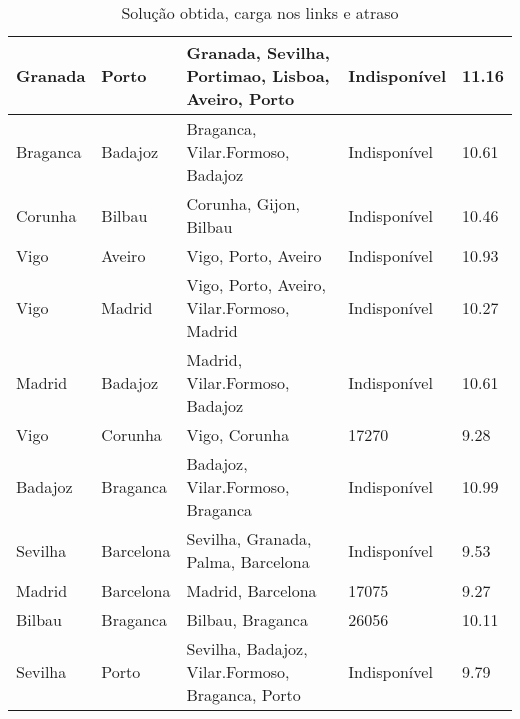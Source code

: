 \begin{table}[!htb]
{\begin{tabular}{|l|l|l|l|l|}
Granada & Porto & Granada, Sevilha, Portimao, Lisboa, Aveiro, Porto & Indisponível & 11.16 \\ \hline
Braganca & Badajoz & Braganca, Vilar.Formoso, Badajoz & Indisponível & 10.61 \\ \hline
Corunha & Bilbau & Corunha, Gijon, Bilbau & Indisponível & 10.46 \\ \hline
Vigo & Aveiro & Vigo, Porto, Aveiro & Indisponível & 10.93 \\ \hline
Vigo & Madrid & Vigo, Porto, Aveiro, Vilar.Formoso, Madrid & Indisponível & 10.27 \\ \hline
Madrid & Badajoz & Madrid, Vilar.Formoso, Badajoz & Indisponível & 10.61 \\ \hline
Vigo & Corunha & Vigo, Corunha & 17270 & 9.28 \\ \hline
Badajoz & Braganca & Badajoz, Vilar.Formoso, Braganca & Indisponível & 10.99 \\ \hline
Sevilha & Barcelona & Sevilha, Granada, Palma, Barcelona & Indisponível & 9.53 \\ \hline
Madrid & Barcelona & Madrid, Barcelona & 17075 & 9.27 \\ \hline
Bilbau & Braganca & Bilbau, Braganca & 26056 & 10.11 \\ \hline
Sevilha & Porto & Sevilha, Badajoz, Vilar.Formoso, Braganca, Porto & Indisponível & 9.79 \\ \hline
\end{tabular}}
\caption[]{Solução obtida, carga nos links e atraso}
\end{table}

